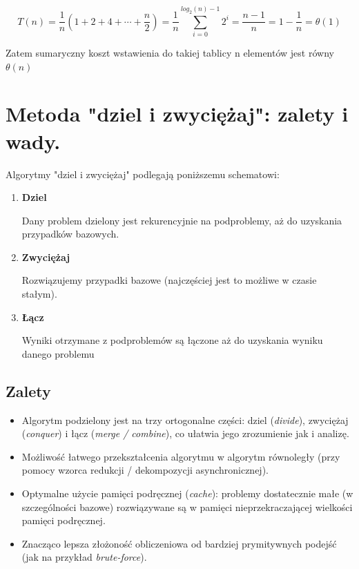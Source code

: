 \documentclass[12pt]{article}
\begin{document}
    $$T(n) = \frac{1}{n} (1 + 2 + 4 + \cdots + \frac{n}{2}) =
    \frac{1}{n} \sum_{i = 0}^{log_2(n) - 1}2^i
    = \frac{n - 1}{n} = 1 - \frac{1}{n} = \theta(1)$$

    Zatem sumaryczny koszt wstawienia do takiej tablicy n elementów jest równy $\theta(n)$

    \newpage

    \section{Metoda "dziel i zwyciężaj": zalety i wady.}

    Algorytmy "dziel i zwyciężaj" podlegają poniższemu schematowi:

    \begin{enumerate}
        \item
        \textbf{Dziel}

        Dany problem dzielony jest rekurencyjnie na podproblemy, aż do uzyskania przypadków
        bazowych.

        \item
        \textbf{Zwyciężaj}

        Rozwiązujemy przypadki bazowe (najczęściej jest to możliwe w
        czasie stałym).

        \item
        \textbf{Łącz}

        Wyniki otrzymane z podproblemów są łączone aż do uzyskania wyniku danego problemu
    \end{enumerate}

    \subsection{Zalety}

    \begin{itemize}
        \item Algorytm podzielony jest na trzy ortogonalne części: dziel (\textit{divide}),
        zwyciężaj (\textit{conquer}) i łącz (\textit{merge / combine}), co ułatwia jego
        zrozumienie jak i analizę.

        \item Możliwość łatwego przekształcenia algorytmu w algorytm równoległy (przy pomocy
        wzorca redukcji / dekompozycji asynchronicznej).

        \item Optymalne użycie pamięci podręcznej (\textit{cache}): problemy dostatecznie małe
        (w szczególności bazowe) rozwiązywane są w pamięci
        nieprzekraczającej wielkości pamięci podręcznej.

        \item Znacząco lepsza złożoność obliczeniowa od bardziej prymitywnych
        podejść (jak na przykład \textit{brute-force}).
    \end{itemize}
\end{document}
